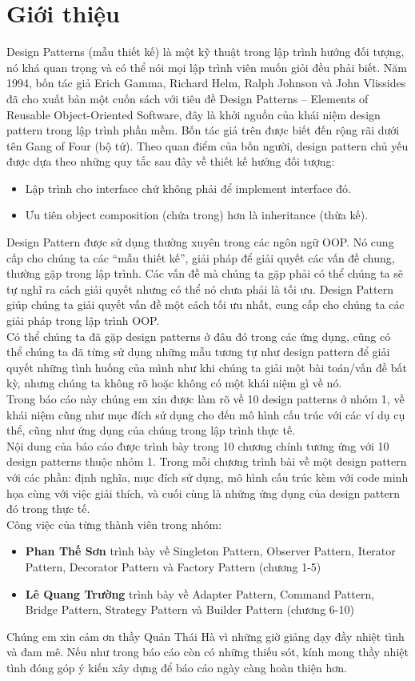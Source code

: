 \chapter*{Giới thiệu}

Design Patterns (mẫu thiết kế) là một kỹ thuật trong lập trình hướng đối tượng, nó khá quan trọng và có thể nói mọi lập trình viên muốn giỏi đều phải biết. Năm 1994, bốn tác giả Erich Gamma, Richard Helm, Ralph Johnson và John Vlissides đã cho xuất bản một cuốn sách với tiêu đề Design Patterns – Elements of Reusable Object-Oriented Software, đây là khởi nguồn của khái niệm design pattern trong lập trình phần mềm. Bốn tác giả trên được biết đến rộng rãi dưới tên Gang of Four (bộ tứ). Theo quan điểm của bốn người, design pattern chủ yếu được dựa theo những quy tắc sau đây về thiết kế hướng đối tượng:
\begin{itemize}
\item Lập trình cho interface chứ không phải để implement interface đó.
\item Ưu tiên object composition (chứa trong) hơn là inheritance (thừa kế).
\end{itemize}

Design Pattern được sử dụng thường xuyên trong các ngôn ngữ OOP. Nó cung cấp cho chúng ta các “mẫu thiết kế”, giải pháp để giải quyết các vấn đề chung, thường gặp trong lập trình. Các vấn đề mà chúng ta gặp phải có thể chúng ta sẽ tự nghĩ ra cách giải quyết nhưng có thể nó chưa phải là tối ưu. Design Pattern giúp chúng ta giải quyết vấn đề một cách tối ưu nhất, cung cấp cho chúng ta các giải pháp trong lập trình OOP.\\

Có thể chúng ta đã gặp design patterns ở đâu đó trong các ứng dụng, cũng có thể chúng ta đã từng sử dụng những mẫu tương tự như design pattern để giải quyết những tình huống của mình như khi chúng ta giải một bài toán/vấn đề bất kỳ, nhưng chúng ta không rõ hoặc không có một khái niệm gì về nó.\\ 

Trong báo cáo này chúng em xin được làm rõ về 10 design patterns ở nhóm 1, về khái niệm cũng như mục đích sử dụng cho đến mô hình cấu trúc với các ví dụ cụ thể, cũng như ứng dụng của chúng trong lập trình thực tế.\\

Nội dung của báo cáo được trình bày trong 10 chương chính tương ứng với 10 design patterns thuộc nhóm 1. Trong mỗi chương trình bài về một design pattern với các phần: định nghĩa, mục đích sử dụng, mô hình cấu trúc kèm với code minh họa cùng với việc giải thích, và cuối cùng là những ứng dụng của design pattern đó trong thực tế.\\
\newpage
Công việc của từng thành viên trong nhóm:
\begin{itemize}
	\item \textbf{Phan Thế Sơn} trình bày về Singleton Pattern, Observer Pattern, Iterator Pattern, Decorator Pattern và Factory Pattern (chương 1-5)
	\item \textbf{Lê Quang Trường} trình bày về Adapter Pattern, Command Pattern, Bridge Pattern, Strategy Pattern và Builder Pattern (chương 6-10)
\end{itemize}

Chúng em xin cảm ơn thầy Quản Thái Hà vì những giờ giảng dạy đầy nhiệt tình và đam mê.  Nếu như trong báo cáo còn có những thiếu sót, kính mong thầy nhiệt tình đóng góp ý kiến xây dựng để báo cáo ngày càng hoàn thiện hơn.